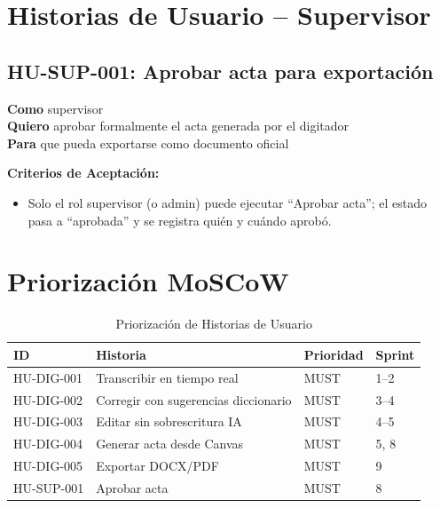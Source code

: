 \documentclass[12pt,a4paper]{report}
\begin{document}
\section{Historias de Usuario -- Supervisor}

\subsection{HU-SUP-001: Aprobar acta para exportación}

\textbf{Como} supervisor \\
\textbf{Quiero} aprobar formalmente el acta generada por el digitador \\
\textbf{Para} que pueda exportarse como documento oficial

\textbf{Criterios de Aceptación:}
\begin{itemize}
    \item Solo el rol supervisor (o admin) puede ejecutar ``Aprobar acta''; el estado pasa a ``aprobada'' y se registra quién y cuándo aprobó.
\end{itemize}

\section{Priorización MoSCoW}

\begin{table}[H]
\centering
\small
\begin{tabular}{|p{2.2cm}|p{5.5cm}|p{2.2cm}|p{2.2cm}|}
\hline
\rowcolor{primaryblue!20}
\textbf{ID} & \textbf{Historia} & \textbf{Prioridad} & \textbf{Sprint} \\
\hline
HU-DIG-001 & Transcribir en tiempo real & MUST & 1--2 \\
\hline
HU-DIG-002 & Corregir con sugerencias diccionario & MUST & 3--4 \\
\hline
HU-DIG-003 & Editar sin sobrescritura IA & MUST & 4--5 \\
\hline
HU-DIG-004 & Generar acta desde Canvas & MUST & 5, 8 \\
\hline
HU-DIG-005 & Exportar DOCX/PDF & MUST & 9 \\
\hline
HU-SUP-001 & Aprobar acta & MUST & 8 \\
\hline
\end{tabular}
\caption{Priorización de Historias de Usuario}
\end{table}

\end{document}

